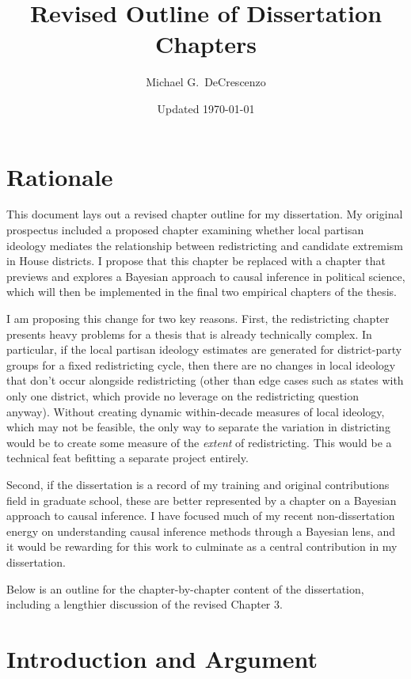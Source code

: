 \documentclass[12pt
              ]{article}
\begin{document}
\title{Revised Outline of Dissertation Chapters}
\author{Michael G.\ DeCrescenzo}
\date{Updated \today}
\maketitle


\section*{Rationale}

This document lays out a revised chapter outline for my dissertation. My original prospectus included a proposed chapter examining whether local partisan ideology mediates the relationship between redistricting and candidate extremism in House districts. I propose that this chapter be replaced with a chapter that previews and explores a Bayesian approach to causal inference in political science, which will then be implemented in the final two empirical chapters of the thesis.

I am proposing this change for two key reasons. First, the redistricting chapter presents heavy problems for a thesis that is already technically complex. In particular, if the local partisan ideology estimates are generated for district-party groups for a fixed redistricting cycle, then there are no changes in local ideology that don't occur alongside redistricting (other than edge cases such as states with only one district, which provide no leverage on the redistricting question anyway). Without creating dynamic within-decade measures of local ideology, which may not be feasible, the only way to separate the variation in districting would be to create some measure of the \emph{extent} of redistricting. This would be a technical feat befitting a separate project entirely. 

Second, if the dissertation is a record of my training and original contributions field in graduate school, these are better represented by a chapter on a Bayesian approach to causal inference. I have focused much of my recent non-dissertation energy on understanding causal inference methods through a Bayesian lens, and it would be rewarding for this work to culminate as a central contribution in my dissertation.

Below is an outline for the chapter-by-chapter content of the dissertation, including a lengthier discussion of the revised Chapter 3.

\section{Introduction and Argument}
\end{document}

